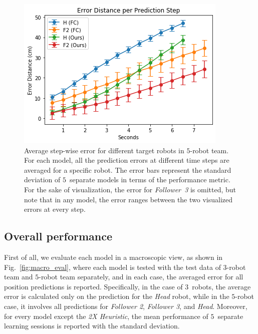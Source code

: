 \documentclass[letterpaper, 10 pt, conference]{ieeeconf}  %
\begin{document}
	\begin{figure}[t]
		\centering
		\includegraphics[width=1.\columnwidth]{fig_micro_eval}
		\caption{Average step-wise error for different target robots in $5$-robot team. 
			For each model, all the prediction errors at different time steps are averaged 
			for a specific robot. The error bars represent the standard deviation of 
			$5$~separate models in terms of the performance metric. For the sake of 
			visualization, the error for \emph{Follower~3} is omitted, but note that 
			in any model, the error ranges between the two visualized errors at every step. 
		}
		\label{fig:micro_eval}
	\end{figure}

	
	\subsection{Overall performance}
	\label{sec:overall_performance}
	
	First of all, we evaluate each model in a macroscopic view, as shown in 	
	Fig.~\ref{fig:macro_eval}, where each model is tested with the 
	test data of $3$-robot team and $5$-robot team separately, and in each case, 
	the averaged error for all position predictions is reported. 
	Specifically, in the case of $3$~robots, the average error is calculated only on 
	the prediction for the \emph{Head} robot, while in the $5$-robot case, 
	it involves all predictions for \emph{Follower 2}, \emph{Follower 3}, and \emph{Head}.  
	Moreover, for every model except the \emph{2X Heuristic}, the mean performance of 
	$5$~separate learning sessions is reported with the standard deviation. 
	
\end{document}
